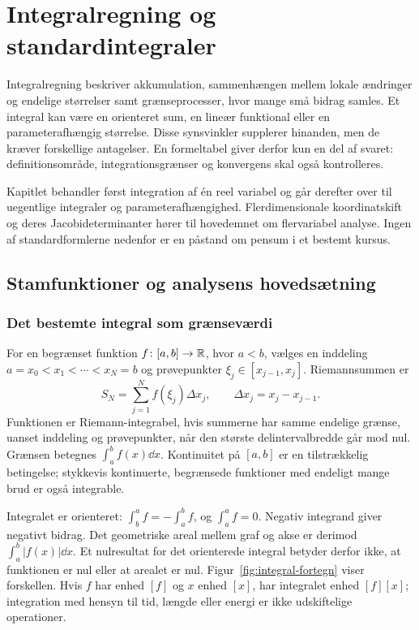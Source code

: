 \chapter{Integralregning og standardintegraler}
\label{ch:integral}
Integralregning beskriver akkumulation, sammenhængen mellem lokale ændringer
og endelige størrelser samt grænseprocesser, hvor mange små bidrag samles.
Et integral kan være en orienteret sum, en lineær funktional eller en
parameterafhængig størrelse. Disse synsvinkler supplerer hinanden, men de
kræver forskellige antagelser. En formeltabel giver derfor kun en del af
svaret: definitionsområde, integrationsgrænser og konvergens skal også
kontrolleres.

Kapitlet behandler først integration af én reel variabel og går derefter
over til uegentlige integraler og parameterafhængighed. Flerdimensionale
koordinatskift og deres Jacobideterminanter hører til hovedemnet om
flervariabel analyse. Ingen af standardformlerne nedenfor er en påstand om
pensum i et bestemt kursus.

\section{Stamfunktioner og analysens hovedsætning}
\label{sec:integral-grundlag}
\subsection{Det bestemte integral som grænseværdi}
For en begrænset funktion $f\colon[a,b]\to\mathbb{R}$, hvor $a<b$, vælges en
inddeling $a=x_0<x_1<\cdots<x_N=b$ og prøvepunkter
$\xi_j\in[x_{j-1},x_j]$. Riemannsummen er
\[
 S_N=\sum_{j=1}^N f(\xi_j)\Delta x_j,\qquad
 \Delta x_j=x_j-x_{j-1}.
\]
Funktionen er Riemann-integrabel, hvis summerne har samme endelige grænse,
uanset inddeling og prøvepunkter, når den største delintervalbredde går
mod nul. Grænsen betegnes $\int_a^b f(x)\dd x$. Kontinuitet på $[a,b]$ er
en tilstrækkelig betingelse; stykkevis kontinuerte, begrænsede funktioner
med endeligt mange brud er også integrable.

Integralet er orienteret: $\int_b^a f=-\int_a^b f$, og
$\int_a^a f=0$. Negativ integrand giver negativt bidrag. Det geometriske
areal mellem graf og akse er derimod $\int_a^b|f(x)|\dd x$. Et nulresultat
for det orienterede integral betyder derfor ikke, at funktionen er nul
eller at arealet er nul. Figur~\ref{fig:integral-fortegn} viser forskellen.
Hvis $f$ har enhed $[f]$ og $x$ enhed $[x]$, har integralet enhed
$[f][x]$; integration med hensyn til tid, længde eller energi er ikke
udskiftelige operationer.

